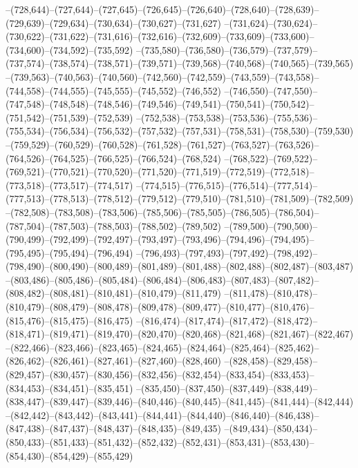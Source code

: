 --(728,644)--(727,644)--(727,645)--(726,645)--(726,640)--(728,640)--(728,639)--(729,639)--(729,634)--(730,634)--(730,627)--(731,627)
--(731,624)--(730,624)--(730,622)--(731,622)--(731,616)--(732,616)--(732,609)--(733,609)--(733,600)--(734,600)--(734,592)--(735,592)
--(735,580)--(736,580)--(736,579)--(737,579)--(737,574)--(738,574)--(738,571)--(739,571)--(739,568)--(740,568)--(740,565)--(739,565)
--(739,563)--(740,563)--(740,560)--(742,560)--(742,559)--(743,559)--(743,558)--(744,558)--(744,555)--(745,555)--(745,552)--(746,552)
--(746,550)--(747,550)--(747,548)--(748,548)--(748,546)--(749,546)--(749,541)--(750,541)--(750,542)--(751,542)--(751,539)--(752,539)
--(752,538)--(753,538)--(753,536)--(755,536)--(755,534)--(756,534)--(756,532)--(757,532)--(757,531)--(758,531)--(758,530)--(759,530)
--(759,529)--(760,529)--(760,528)--(761,528)--(761,527)--(763,527)--(763,526)--(764,526)--(764,525)--(766,525)--(766,524)--(768,524)
--(768,522)--(769,522)--(769,521)--(770,521)--(770,520)--(771,520)--(771,519)--(772,519)--(772,518)--(773,518)--(773,517)--(774,517)
--(774,515)--(776,515)--(776,514)--(777,514)--(777,513)--(778,513)--(778,512)--(779,512)--(779,510)--(781,510)--(781,509)--(782,509)
--(782,508)--(783,508)--(783,506)--(785,506)--(785,505)--(786,505)--(786,504)--(787,504)--(787,503)--(788,503)--(788,502)--(789,502)
--(789,500)--(790,500)--(790,499)--(792,499)--(792,497)--(793,497)--(793,496)--(794,496)--(794,495)--(795,495)--(795,494)--(796,494)
--(796,493)--(797,493)--(797,492)--(798,492)--(798,490)--(800,490)--(800,489)--(801,489)--(801,488)--(802,488)--(802,487)--(803,487)
--(803,486)--(805,486)--(805,484)--(806,484)--(806,483)--(807,483)--(807,482)--(808,482)--(808,481)--(810,481)--(810,479)--(811,479)
--(811,478)--(810,478)--(810,479)--(808,479)--(808,478)--(809,478)--(809,477)--(810,477)--(810,476)--(815,476)--(815,475)--(816,475)
--(816,474)--(817,474)--(817,472)--(818,472)--(818,471)--(819,471)--(819,470)--(820,470)--(820,468)--(821,468)--(821,467)--(822,467)
--(822,466)--(823,466)--(823,465)--(824,465)--(824,464)--(825,464)--(825,462)--(826,462)--(826,461)--(827,461)--(827,460)--(828,460)
--(828,458)--(829,458)--(829,457)--(830,457)--(830,456)--(832,456)--(832,454)--(833,454)--(833,453)--(834,453)--(834,451)--(835,451)
--(835,450)--(837,450)--(837,449)--(838,449)--(838,447)--(839,447)--(839,446)--(840,446)--(840,445)--(841,445)--(841,444)--(842,444)
--(842,442)--(843,442)--(843,441)--(844,441)--(844,440)--(846,440)--(846,438)--(847,438)--(847,437)--(848,437)--(848,435)--(849,435)
--(849,434)--(850,434)--(850,433)--(851,433)--(851,432)--(852,432)--(852,431)--(853,431)--(853,430)--(854,430)--(854,429)--(855,429)
